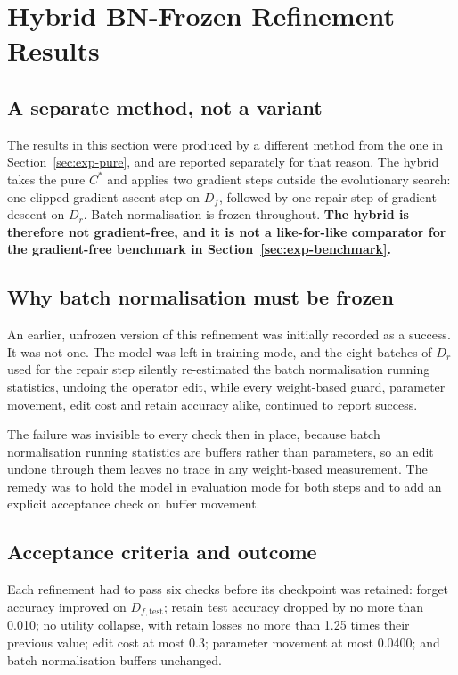 \section{Hybrid BN-Frozen Refinement Results}
\label{sec:exp-hybrid}

\subsection{A separate method, not a variant}

The results in this section were produced by a different method from the one in
Section~\ref{sec:exp-pure}, and are reported separately for that reason. The
hybrid takes the pure $C^{*}$ and applies two gradient steps outside the
evolutionary search: one clipped gradient-ascent step on $D_f$, followed by one
repair step of gradient descent on $D_r$. Batch normalisation is frozen throughout.
\textbf{The hybrid is therefore not gradient-free, and it is not a like-for-like
comparator for the gradient-free benchmark in Section~\ref{sec:exp-benchmark}.}

\subsection{Why batch normalisation must be frozen}

An earlier, unfrozen version of this refinement was initially recorded as a
success. It was not one. The model was left in training mode, and the eight
batches of $D_r$ used for the repair step silently re-estimated the batch
normalisation running statistics, undoing the operator edit, while every
weight-based guard, parameter movement, edit cost and retain accuracy alike,
continued to report success.

The failure was invisible to every check then in place, because batch
normalisation running statistics are buffers rather than parameters, so an edit
undone through them leaves no trace in any weight-based measurement. The remedy
was to hold the model in evaluation mode for both steps and to add an explicit
acceptance check on buffer movement.

\subsection{Acceptance criteria and outcome}

Each refinement had to pass six checks before its checkpoint was retained: forget
accuracy improved on $D_{f,\text{test}}$; retain test accuracy dropped by no more
than 0.010; no utility collapse, with retain losses no more than 1.25 times their
previous value; edit cost at most 0.3; parameter movement at most 0.0400; and
batch normalisation buffers unchanged.

